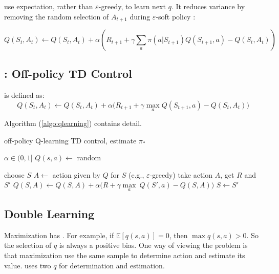  use expectation, rather than $\varepsilon$-greedy, to learn next $q$. It reduces variance by removing the random selection of $A_{t+1}$ during $\varepsilon$-soft policy :

\begin{equation}
	Q(S_t,A_t) \gets Q(S_t,A_t) + \alpha \left ( R_{t+1} + \gamma \sum_a \pi(a|S_{t+1}) Q(S_{t+1},a) - Q(S_t,A_t) \right )
\end{equation}


\subsection{: Off-policy TD Control}

 is defined as:
\begin{equation}
	Q(S_t,A_t) \gets Q(S_t,A_t) + \alpha \Big ( R_{t+1} + \gamma \max_a Q(S_{t+1},a) - Q(S_t,A_t) \Big )
\end{equation}



Algorithm (\ref{algo:qlearning}) contains detail.

\begin{algorithm}
	\caption{off-policy Q-learning TD control, estimate $\pi_*$}\label{algo:qlearning}	
	
	\begin{algorithmic}[1]
		\State $ \alpha \in (0,1]$
		\State $Q(s,a) \gets$ random
		
		\Statex
		
		\Loop
			\State choose $S$
			\Repeat
				\State $A \gets$ action given by $Q$ for $S$ (e.g., $\varepsilon$-greedy)
				\State take action $A$, get $R$ and $S'$
				\State $Q(S,A) \gets Q(S,A) + \alpha \Big ( R + \gamma \underset{a}{\max}\ Q(S',a) - Q(S,A) \Big )$
				\State $S \gets S'$
		\EndLoop		
	\end{algorithmic}
\end{algorithm}

\subsection{Double Learning}

Maximization has . For example, if $\mathbb{E}[q(s,a)] = 0$, then $\max q(s,a) > 0$. So the selection of $q$ is always a positive bias. One way of viewing the problem is that maximization use the same sample to determine action and estimate its value.  uses two $q$ for determination and estimation.


